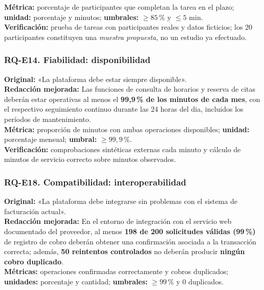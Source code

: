 \documentclass[12pt,a4paper]{article}
\begin{document}
\textbf{Métrica:} porcentaje de participantes que completan la tarea en el plazo; \textbf{unidad:} porcentaje y minutos; \textbf{umbrales:} $\geq 85$\,\% y $\leq 5$ min.\\

\textbf{Verificación:} prueba de tareas con participantes reales y datos ficticios; los 20 participantes constituyen una \emph{muestra propuesta}, no un estudio ya efectuado.

\subsubsection*{RQ-E14. Fiabilidad: disponibilidad}

\textbf{Original:} «La plataforma debe estar siempre disponible».\\

\textbf{Redacción mejorada:} Las funciones de consulta de horarios y reserva de citas deberán estar operativas al menos el \textbf{99,9\,\% de los minutos de cada mes}, con el respectivo seguimiento continuo durante las 24 horas del dia, incluidos los períodos de mantenimiento.\\

\textbf{Métrica:} proporción de minutos con ambas operaciones disponibles; \textbf{unidad:} porcentaje mensual; \textbf{umbral:} $\geq 99{,}9$\,\%.\\

\textbf{Verificación:} comprobaciones sintéticas externas cada minuto y cálculo de minutos de servicio correcto sobre minutos observados.

\subsubsection*{RQ-E18. Compatibilidad: interoperabilidad}

\textbf{Original:} «La plataforma debe integrarse sin problemas con el sistema de facturación actual».\\

\textbf{Redacción mejorada:} En el entorno de integración con el servicio web documentado del proveedor, al menos \textbf{198 de 200 solicitudes válidas (99\,\%)} de registro de cobro deberán obtener una confirmación asociada a la transacción correcta; además, \textbf{50 reintentos controlados} no deberán producir \textbf{ningún cobro duplicado}.\\

\textbf{Métricas:} operaciones confirmadas correctamente y cobros duplicados; \textbf{unidades:} porcentaje y cantidad; \textbf{umbrales:} $\geq 99$\,\% y $0$ duplicados.\\
\end{document}
